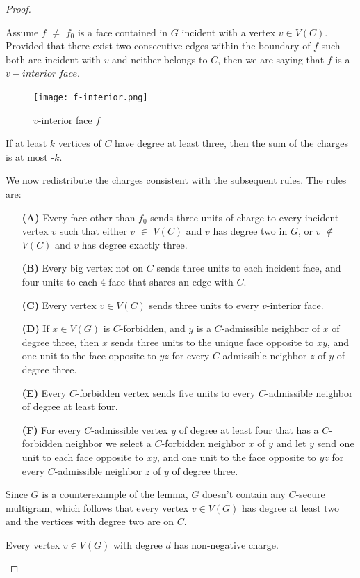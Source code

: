 \begin{proof}
\begin{definition}
Assume $f$ $\neq$ $f_0$ is a face contained in $G$ incident with a vertex $v \in V(C)$. Provided that there exist two consecutive edges within the boundary of $f$ such both are incident with $v$ and neither belongs to $C$, then we are saying that $f$ is a $v-interior \
face$. \cite{dvorak2013threecoloring}
\end{definition}

\begin{figure}[H] %
\centering %
\texttt{[image: f-interior.png]} 
\caption{$v$-interior face $f$} %
\label{figure} %
\end{figure}

\begin{corollary}
If at least $k$ vertices of $C$ have degree at least three, then the sum of the
charges is at most -$k$. \cite{dvorak2013threecoloring}
\end{corollary}

We now redistribute the charges consistent with the subsequent rules.
The rules are:\cite{dvorak2013threecoloring}
\begin{itemize}
    \item[\textbf{(A)}] Every face other than $f_0$ sends three units of charge to every incident vertex $v$ such that either $v$ $\in$ $V(C)$ and $v$ has degree two in $G$, or $v$ $\notin$ $V(C)$ and $v$ has degree exactly three.
    \item[\textbf{(B)}] Every big vertex not on $C$ sends three units to each incident face, and
four units to each 4-face that shares an edge with $C$.
\item[\textbf{(C)}] Every vertex $v \in V(C)$ sends three units to every $v$-interior face.
\item[\textbf{(D)}] If $x \in V(G)$ is $C$-forbidden, and $y$ is a $C$-admissible neighbor of $x$ of
degree three, then $x$ sends three units to the unique face opposite to $xy$,
and one unit to the face opposite to $yz$ for every $C$-admissible neighbor
$z$ of $y$ of degree three.
\item[\textbf{(E)}] Every $C$-forbidden vertex sends five units to every $C$-admissible neighbor
of degree at least four.
\item[\textbf{(F)}] For every $C$-admissible vertex $y$ of degree at least four that has a $C$-forbidden neighbor we select a $C$-forbidden neighbor $x$ of $y$ and let $y$
send one unit to each face opposite to $xy$, and one unit to the face
opposite to $yz$ for every $C$-admissible neighbor $z$ of $y$ of degree three.
\end{itemize}
Since $G$ is a counterexample of the lemma, $G$ doesn't contain any $C$-secure multigram, which follows that every vertex $v \in V(G)$ has degree at least two and the vertices with degree two are on $C$. 
\begin{claim}
Every vertex $v \in V(G)$ with degree $d$ has non-negative charge.
\end{claim}


\end{proof}
